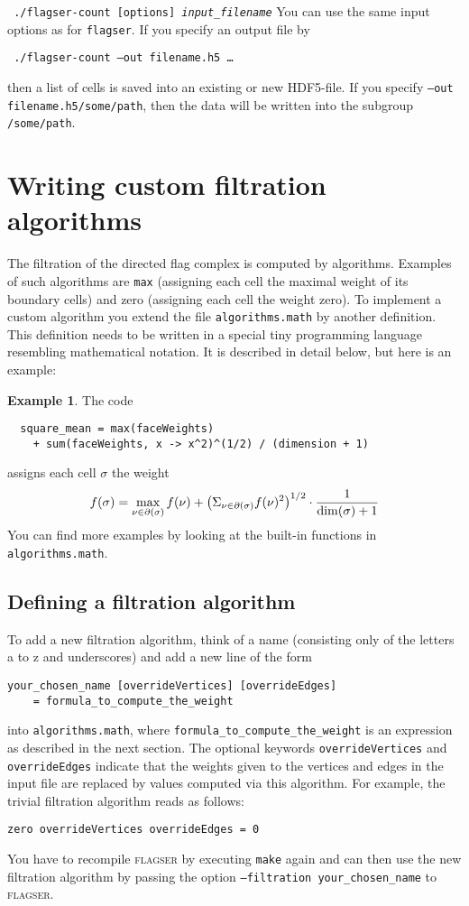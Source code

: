 \documentclass{amsart}
\theoremstyle{definition}
\newtheorem*{example*}{Example}
\let\originalleft\left
\let\originalright\right
\renewcommand{\left}{\mathopen{}\mathclose\bgroup\originalleft}
\renewcommand{\right}{\aftergroup\egroup\originalright}
\begin{document}
\noindent
\verb| |\qquad\texttt{./flagser-count [options] \textit{input\_filename}}
You can use the same input options as for \texttt{flagser}. If you specify an output file by

\noindent
\verb| |\qquad\texttt{./flagser-count --out filename.h5 \ldots}

\noindent
then a list of cells is saved into an existing or new HDF5-file. If you specify \texttt{--out
filename.h5/some/path}, then the data will be written into the subgroup \texttt{/some/path}.

\section{Writing custom filtration algorithms}
The filtration of the directed flag complex is computed by algorithms.
Examples of such algorithms are \texttt{max} (assigning each cell the maximal weight of its
boundary cells) and zero (assigning each cell the weight zero).
To implement a custom algorithm you extend the file \texttt{algorithms.math} by another definition.
This definition needs to be written in a special tiny programming language resembling mathematical
notation.
It is described in detail below, but here is an example:

\begin{example*}
The code
\begin{verbatim}
  square_mean = max(faceWeights)
    + sum(faceWeights, x -> x^2)^(1/2) / (dimension + 1)
\end{verbatim}
assigns each cell $\sigma$ the weight
\[
  f(\sigma) = \max_{\nu\in\partial(\sigma)} f(\nu) +
  \left(\Sigma_{\nu\in\partial(\sigma)} f(\nu)^2\right)^{1/2}\cdot
  \frac{1}{\dim(\sigma) + 1}
\]
You can find more examples by looking at the built-in functions in \texttt{algorithms.math}.
\end{example*}

\subsection{Defining a filtration algorithm}
To add a new filtration algorithm, think of a name (consisting only of the letters a to z and
underscores) and add a new line of the form
\begin{verbatim}
your_chosen_name [overrideVertices] [overrideEdges]
    = formula_to_compute_the_weight
\end{verbatim}
into \texttt{algorithms.math}, where \texttt{formula\_to\_compute\_the\_weight} is an expression
as described in the next section.
The optional keywords \texttt{overrideVertices} and \texttt{overrideEdges} indicate that the
weights given to the vertices and edges in the input file are replaced by values computed
via this algorithm.
For example, the trivial filtration algorithm reads as follows:
\begin{verbatim}
zero overrideVertices overrideEdges = 0
\end{verbatim}
You have to recompile \textsc{flagser} by executing \texttt{make} again and can then use the new
filtration algorithm by passing the option \texttt{--filtration your\_chosen\_name} to
\textsc{flagser}.
\end{document}
